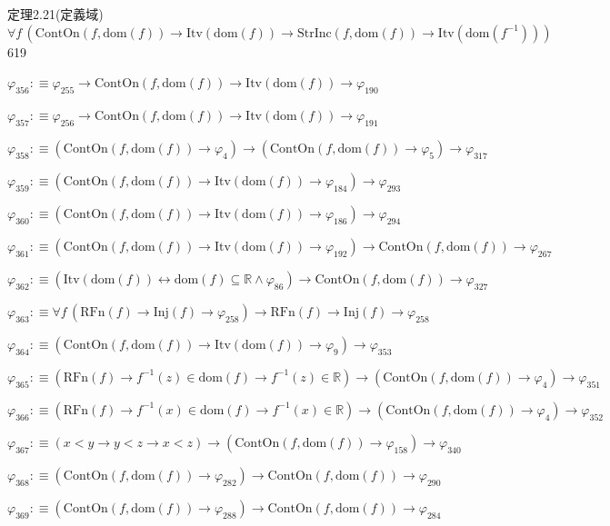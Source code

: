 \begin{fullproof}{定理2.21(定義域)}{$\forall f\,(\mathrm{ContOn}(f,\mathrm{dom}(f)) \to \mathrm{Itv}(\mathrm{dom}(f)) \to \mathrm{StrInc}(f,\mathrm{dom}(f)) \to \mathrm{Itv}(\mathrm{dom}(f^{-1})))$}{619}
\begin{abbrevlist}
\item $\varphi_{356} :\equiv \varphi_{255} \to \mathrm{ContOn}(f,\mathrm{dom}(f)) \to \mathrm{Itv}(\mathrm{dom}(f)) \to \varphi_{190}$
\item $\varphi_{357} :\equiv \varphi_{256} \to \mathrm{ContOn}(f,\mathrm{dom}(f)) \to \mathrm{Itv}(\mathrm{dom}(f)) \to \varphi_{191}$
\item $\varphi_{358} :\equiv (\mathrm{ContOn}(f,\mathrm{dom}(f)) \to \varphi_{4}) \to (\mathrm{ContOn}(f,\mathrm{dom}(f)) \to \varphi_{5}) \to \varphi_{317}$
\item $\varphi_{359} :\equiv (\mathrm{ContOn}(f,\mathrm{dom}(f)) \to \mathrm{Itv}(\mathrm{dom}(f)) \to \varphi_{184}) \to \varphi_{293}$
\item $\varphi_{360} :\equiv (\mathrm{ContOn}(f,\mathrm{dom}(f)) \to \mathrm{Itv}(\mathrm{dom}(f)) \to \varphi_{186}) \to \varphi_{294}$
\item $\varphi_{361} :\equiv (\mathrm{ContOn}(f,\mathrm{dom}(f)) \to \mathrm{Itv}(\mathrm{dom}(f)) \to \varphi_{192}) \to \mathrm{ContOn}(f,\mathrm{dom}(f)) \to \varphi_{267}$
\item $\varphi_{362} :\equiv (\mathrm{Itv}(\mathrm{dom}(f)) \leftrightarrow \mathrm{dom}(f) \subseteq \mathbb{R} \land \varphi_{86}) \to \mathrm{ContOn}(f,\mathrm{dom}(f)) \to \varphi_{327}$
\item $\varphi_{363} :\equiv \forall f\,(\mathrm{RFn}(f) \to \mathrm{Inj}(f) \to \varphi_{258}) \to \mathrm{RFn}(f) \to \mathrm{Inj}(f) \to \varphi_{258}$
\item $\varphi_{364} :\equiv (\mathrm{ContOn}(f,\mathrm{dom}(f)) \to \mathrm{Itv}(\mathrm{dom}(f)) \to \varphi_{9}) \to \varphi_{353}$
\item $\varphi_{365} :\equiv (\mathrm{RFn}(f) \to f^{-1}(z) \in \mathrm{dom}(f) \to f^{-1}(z) \in \mathbb{R}) \to (\mathrm{ContOn}(f,\mathrm{dom}(f)) \to \varphi_{4}) \to \varphi_{351}$
\item $\varphi_{366} :\equiv (\mathrm{RFn}(f) \to f^{-1}(x) \in \mathrm{dom}(f) \to f^{-1}(x) \in \mathbb{R}) \to (\mathrm{ContOn}(f,\mathrm{dom}(f)) \to \varphi_{4}) \to \varphi_{352}$
\item $\varphi_{367} :\equiv (x < y \to y < z \to x < z) \to (\mathrm{ContOn}(f,\mathrm{dom}(f)) \to \varphi_{158}) \to \varphi_{340}$
\item $\varphi_{368} :\equiv (\mathrm{ContOn}(f,\mathrm{dom}(f)) \to \varphi_{282}) \to \mathrm{ContOn}(f,\mathrm{dom}(f)) \to \varphi_{290}$
\item $\varphi_{369} :\equiv (\mathrm{ContOn}(f,\mathrm{dom}(f)) \to \varphi_{288}) \to \mathrm{ContOn}(f,\mathrm{dom}(f)) \to \varphi_{284}$

\end{abbrevlist}
\end{fullproof}

